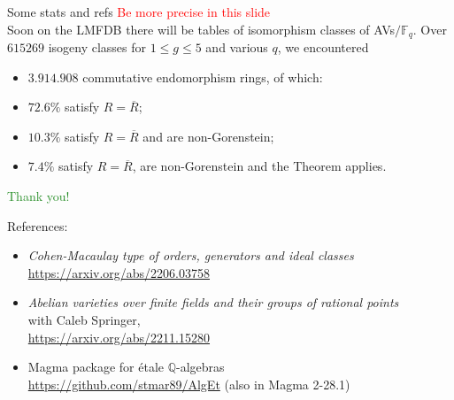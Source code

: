 \documentclass[usenames,dvipsnames,handout]{beamer}
\def\Q{\mathbb{Q}}
\def\F{\mathbb{F}}
\newcommand{\red}[1]{\textcolor{red}{#1}}
\newcommand{\green}[1]{\textcolor{ForestGreen}{#1}}
\begin{document}
\begin{frame}{ Some stats and refs }
    \red{Be more precise in this slide\\}
    Soon on the LMFDB there will be tables of isomorphism classes of AVs$/\F_q$.
    \pause Over $615269$ isogeny classes for $1\leq g \leq 5$ and various $q$, we encountered
    \begin{itemize}
        \item $3.914.908$ commutative endomorphism rings, of which:
        \item \pause $72.6 \%$ satisfy $R=\overline{R}$;
        \item \pause $10.3 \%$ satisfy $R=\overline{R}$ and are non-Gorenstein;
        \item \pause $7.4 \%$ satisfy $R=\overline{R}$, are non-Gorenstein and the Theorem applies.
	\end{itemize}
\end{frame}

\begin{frame}{  }
    \begin{center}
    \green{\huge Thank you!}
    \end{center}
    \pause 
    {\footnotesize References:
    \begin{itemize}
        \item \emph{Cohen-Macaulay type of orders, generators and ideal classes}\\
            \url{https://arxiv.org/abs/2206.03758}
        \item \emph{Abelian varieties over finite fields and their groups of rational points}\\
            with Caleb Springer,\\
            \url{https://arxiv.org/abs/2211.15280}
        \item Magma package for \'etale $\Q$-algebras\\
            \url{https://github.com/stmar89/AlgEt} 
            (also in Magma 2-28.1)
    \end{itemize}
    }
\end{frame}

	
\end{document}

